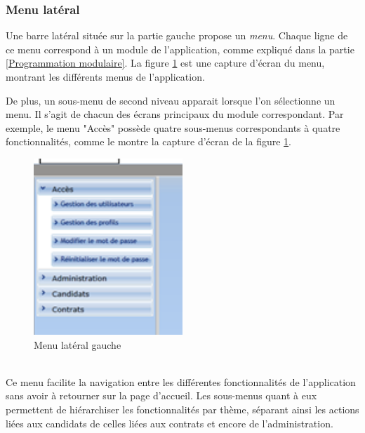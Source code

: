 \subsubsection{Menu latéral}

Une barre latéral située sur la partie gauche propose un \textit{menu}.
Chaque ligne de ce menu correspond à un module de l'application, comme expliqué dans la partie \ref{Programmation modulaire}.
La figure \ref{menu} est une capture d'écran du menu, montrant les différents menus de l'application.

De plus, un sous-menu de second niveau apparait lorsque l'on sélectionne un menu.
Il s'agit de chacun des écrans principaux du module correspondant.
Par exemple, le menu "Accès" possède quatre sous-menus correspondants à quatre fonctionnalités, comme le montre la capture d'écran de la figure \ref{menu}.

\begin{figure}[!h]
	\center
	\includegraphics[width=0.5\textwidth]{img/menu.png}
	\caption{Menu latéral gauche}
	\label{menu}
\end{figure}
~~\\

Ce menu facilite la navigation entre les différentes fonctionnalités de l'application sans avoir à retourner sur la page d'accueil.
Les sous-menus quant à eux permettent de hiérarchiser les fonctionnalités par thème, séparant ainsi les actions liées aux candidats de celles liées aux contrats et encore de l'administration.


